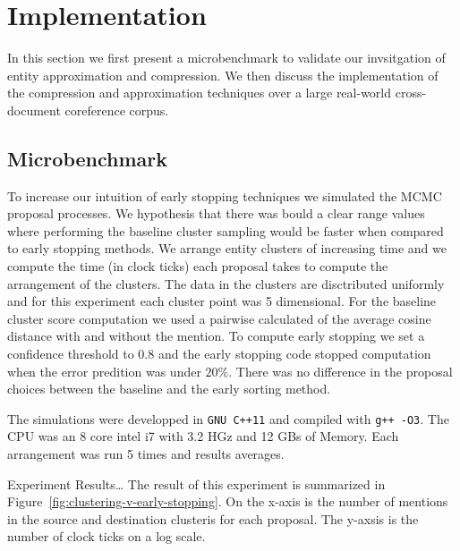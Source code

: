 
\section{Implementation}

In this section we first present a microbenchmark to validate our invsitgation of entity approximation and compression.
We then discuss the implementation of the compression and approximation techniques over a large real-world
cross-document coreference corpus.

\subsection{Microbenchmark}
\label{sec:microbenchmark}
To increase our intuition of early stopping techniques we simulated the MCMC proposal processes. 
We hypothesis that there was bould a clear range values where performing the
baseline cluster sampling would be faster when compared to early stopping methods.
We arrange entity clusters of increasing time and we compute the time (in clock ticks)
each proposal takes to compute the arrangement of the clusters.
The data in the clusters are disctributed uniformly and for this experiment each cluster point
was 5 dimensional.
For the baseline cluster score computation we used a pairwise calculated of the average cosine distance
with and without the mention.
To compute early stopping we set a confidence threshold to $0.8$ and the early
stopping code stopped computation when the error predition was under $20\%$.
There was no difference in the proposal choices between the baseline and the early sorting method. 

The simulations were developped in \texttt{GNU C++11} and compiled with \texttt{g++ -O3}. 
The CPU was an 8 core intel i7 with 3.2 HGz and 12 GBs of Memory.
Each arrangement was run 5 times and results averages.


Experiment Results\ldots
The result of this experiment is summarized in Figure~\ref{fig:clustering-v-early-stopping}.
On the x-axis is the number of mentions in the source and destination clusteris for each proposal. 
The y-axsis is the number of clock ticks on a log scale.

